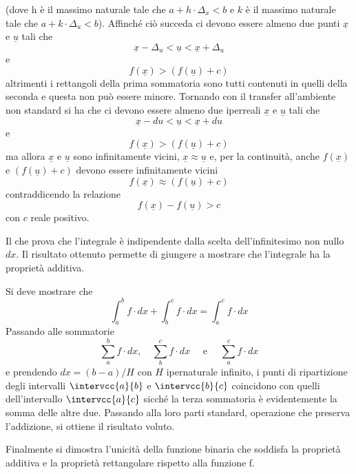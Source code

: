 (dove h è il massimo naturale tale che 
\(a+h \cdot \Delta_x < b\) 
e \(k\) è il massimo naturale tale che
\(a+k \cdot \Delta_u < b\)).
Affinché ciò succeda ci devono essere almeno 
due punti 
\(\underline{x}\) e \(\underline{u}\)
tali che 
\[\underline{x} - \Delta_u < \underline{u} < \underline{x} + \Delta_u \]
e 
\[f(\underline{x}) > (f(\underline{u})+c)\] 
altrimenti i rettangoli della prima sommatoria sono tutti contenuti in quelli 
della seconda e questa non può essere minore. Tornando con il transfer 
all'ambiente non standard si ha che ci devono essere almeno due iperreali 
\(\underline{x}\) e \(\underline{u}\)
tali che 
\[\underline{x} - du < \underline{u} < \underline{x}+ du\]
e 
\[f(\underline{x}) > (f(\underline{u})+c)\] 
ma allora \(\underline{x}\) e \(\underline{u}\)
sono infinitamente vicini,  
\(\underline{x} \approx \underline{u}\)
e, per la continuità, anche 
\(f(\underline{x})\) e \((f(\underline{u})+c)\) 
devono essere infinitamente vicini 
\[f(\underline{x}) \approx (f(\underline{u})+c)\] 
contraddicendo la relazione 
\[f(\underline{x}) - f(\underline{u}) > c\]
con \(c\) reale positivo. 

Il che prova che l'integrale è indipendente dalla scelta dell'infinitesimo 
non 
nullo \(dx\).
Il risultato ottenuto permette di giungere a mostrare che 
l'integrale ha la proprietà additiva.

Si deve mostrare che 
\[\int_a^b f \cdot dx + \int_b^c f \cdot dx = \int_a^c f \cdot 
dx\] 
Passando alle sommatorie 
\[\sum_a^b f \cdot dx,\quad \sum_b^c f \cdot dx \quad\text{ e } \quad 
  \sum_a^c f \cdot dx\] 
e prendendo 
\(dx = (b-a)/H\)
con \(H\) ipernaturale infinito, 
i punti di ripartizione degli intervalli \(\intervcc{a}{b}\) e 
\(\intervcc{b}{c}\) coincidono con quelli dell'intervallo \(\intervcc{a}{c}\)
sicché la terza sommatoria è evidentemente la somma delle altre due.
Passando alla loro parti standard, operazione che preserva l'addizione, si 
ottiene il risultato voluto. 

Finalmente si dimostra l'unicità della funzione binaria che soddisfa la 
proprietà additiva e la proprietà rettangolare rispetto alla funzione f.

